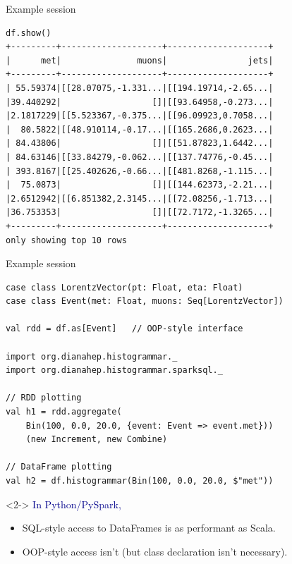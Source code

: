 \documentclass{beamer}
\begin{document}
\begin{frame}[fragile]{Example session}
\small
\begin{verbatim}
df.show()
+---------+--------------------+--------------------+
|      met|               muons|                jets|
+---------+--------------------+--------------------+
| 55.59374|[[28.07075,-1.331...|[[194.19714,-2.65...|
|39.440292|                  []|[[93.64958,-0.273...|
|2.1817229|[[5.523367,-0.375...|[[96.09923,0.7058...|
|  80.5822|[[48.910114,-0.17...|[[165.2686,0.2623...|
| 84.43806|                  []|[[51.87823,1.6442...|
| 84.63146|[[33.84279,-0.062...|[[137.74776,-0.45...|
| 393.8167|[[25.402626,-0.66...|[[481.8268,-1.115...|
|  75.0873|                  []|[[144.62373,-2.21...|
|2.6512942|[[6.851382,2.3145...|[[72.08256,-1.713...|
|36.753353|                  []|[[72.7172,-1.3265...|
+---------+--------------------+--------------------+
only showing top 10 rows
\end{verbatim}
\end{frame}

\begin{frame}[fragile]{Example session}
\small
\begin{verbatim}
case class LorentzVector(pt: Float, eta: Float)
case class Event(met: Float, muons: Seq[LorentzVector])

val rdd = df.as[Event]   // OOP-style interface

import org.dianahep.histogrammar._
import org.dianahep.histogrammar.sparksql._

// RDD plotting
val h1 = rdd.aggregate(
    Bin(100, 0.0, 20.0, {event: Event => event.met}))
    (new Increment, new Combine)

// DataFrame plotting
val h2 = df.histogrammar(Bin(100, 0.0, 20.0, $"met"))
\end{verbatim}

\begin{uncoverenv}<2->
\textcolor{darkblue}{\large In Python/PySpark,}
\begin{itemize}
\item SQL-style access to DataFrames is as performant as Scala.
\item OOP-style access isn't (but class declaration isn't necessary).
\end{itemize}
\end{uncoverenv}
\end{frame}
\end{document}
